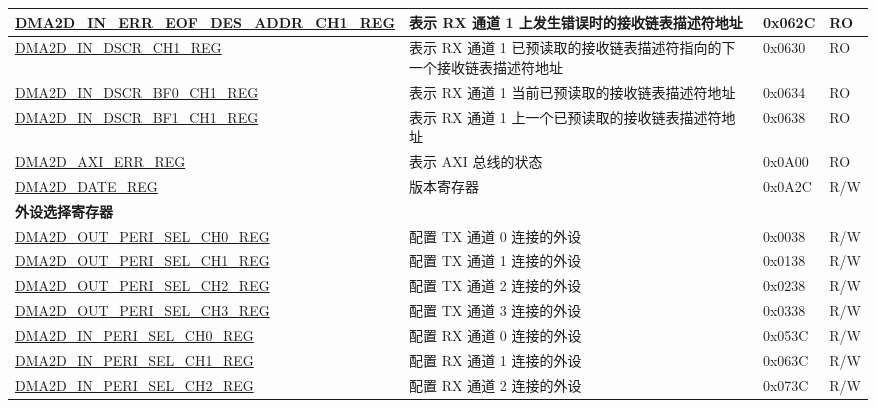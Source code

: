 \begin{longtable}{ | p{7cm} | p{11.5cm} | p{1.3cm} | p{2cm} | }
\hyperref[regdesc:DMA2DINERREOFDESADDRCHNREG]{DMA2D\_IN\_ERR\_EOF\_DES\_ADDR\_CH1\_REG} & 表示 RX 通道 1 上发生错误时的接收链表描述符地址 & 0x062C & RO \\ \hline
\hyperref[regdesc:DMA2DINDSCRCHNREG]{DMA2D\_IN\_DSCR\_CH1\_REG} & 表示 RX 通道 1 已预读取的接收链表描述符指向的下一个接收链表描述符地址 & 0x0630 & RO \\ \hline
\hyperref[regdesc:DMA2DINDSCRBF0CHNREG]{DMA2D\_IN\_DSCR\_BF0\_CH1\_REG} & 表示 RX 通道 1 当前已预读取的接收链表描述符地址 & 0x0634 & RO \\ \hline
\hyperref[regdesc:DMA2DINDSCRBF1CHNREG]{DMA2D\_IN\_DSCR\_BF1\_CH1\_REG} & 表示 RX 通道 1 上一个已预读取的接收链表描述符地址 & 0x0638 & RO \\ \hline
\hyperref[regdesc:DMA2DAXIERRREG]{DMA2D\_AXI\_ERR\_REG} & 表示 AXI 总线的状态 & 0x0A00 & RO \\ \hline
\hyperref[regdesc:DMA2DDATEREG]{DMA2D\_DATE\_REG} & 版本寄存器 & 0x0A2C & R/W \\ \hline
\multicolumn{4}{|l|}{\textbf{外设选择寄存器}} \\ \hline
\hyperref[regdesc:DMA2DOUTPERISELCHNREG]{DMA2D\_OUT\_PERI\_SEL\_CH0\_REG} & 配置 TX 通道 0 连接的外设 & 0x0038 & R/W \\ \hline
\hyperref[regdesc:DMA2DOUTPERISELCHNREG]{DMA2D\_OUT\_PERI\_SEL\_CH1\_REG} & 配置 TX 通道 1 连接的外设 & 0x0138 & R/W \\ \hline
\hyperref[regdesc:DMA2DOUTPERISELCHNREG]{DMA2D\_OUT\_PERI\_SEL\_CH2\_REG} & 配置 TX 通道 2 连接的外设 & 0x0238 & R/W \\ \hline
\hyperref[regdesc:DMA2DOUTPERISELCHNREG]{DMA2D\_OUT\_PERI\_SEL\_CH3\_REG} & 配置 TX 通道 3 连接的外设 & 0x0338 & R/W \\ \hline
\hyperref[regdesc:DMA2DINPERISELCHNREG]{DMA2D\_IN\_PERI\_SEL\_CH0\_REG} & 配置 RX 通道 0 连接的外设 & 0x053C & R/W \\ \hline
\hyperref[regdesc:DMA2DINPERISELCHNREG]{DMA2D\_IN\_PERI\_SEL\_CH1\_REG} & 配置 RX 通道 1 连接的外设 & 0x063C & R/W \\ \hline
\hyperref[regdesc:DMA2DINPERISELCHNREG]{DMA2D\_IN\_PERI\_SEL\_CH2\_REG} & 配置 RX 通道 2 连接的外设 & 0x073C & R/W \\ \hline
\end{longtable}
